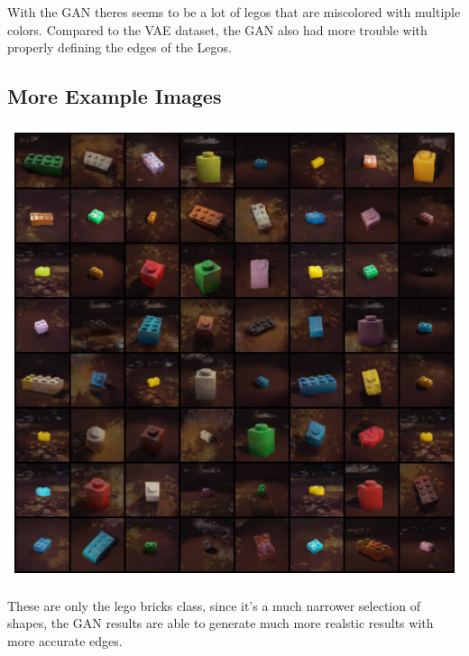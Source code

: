 \documentclass[]{article}
\begin{document}
With the GAN theres seems to be a lot of legos that are miscolored with multiple colors. Compared to the VAE dataset, the GAN also had more trouble with properly defining the edges of the Legos. \\

\subsection*{More Example Images}
\begin{center}
\includegraphics[scale=0.65]{imgs/gan bricks only.png}
\end{center}
These are only the lego bricks class, since it's a much narrower selection of shapes, the GAN results are able to generate much more realstic results with more accurate edges.
\end{document}
